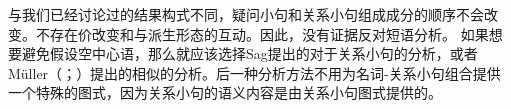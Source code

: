 \begin{exe}
\begin{xlist}[iv.]
\begin{exe}
\begin{xlist}[iv.]
与我们已经讨论过的结果构式不同，疑问小句和关系小句组成成分的顺序不会改变。不存在价改变和与派生形态的互动。因此，没有证据反对短语分析。
如果想要避免假设空中心语，那么就应该选择Sag提出的对于关系小句的分析，或者Müller（\citeyear[Chapter~10]{Mueller99a}；\citeyear[Chapter~11]{MuellerLehrbuch1}）提出的相似的分析。后一种分析方法不用为名词-关系小句组合提供一个特殊的图式，因为关系小句的语义内容是由关系小句图式提供的。%


\end{xlist}
\end{exe}
\end{xlist}
\end{exe}

